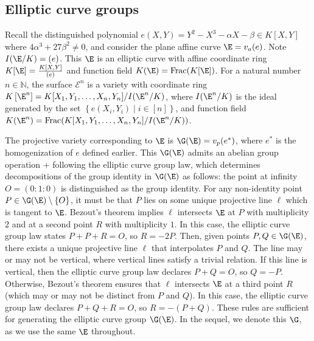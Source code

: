 \documentclass[11pt,letterpaper]{article}
\newcommand{\polys}{K[X,Y]}
\newcommand{\productpolys}{K[X_1, Y_1, \ldots, X_n, Y_n]}
\theoremstyle{definition}
\newcommand{\ff}{K(\E)}
\newcommand{\6}{\mathbf}
\newcommand{\7}{\mathcal}
\begin{document}

\subsection{Elliptic curve groups}

Recall the distinguished polynomial $e(X,Y) = Y^2 - X^3 - \alpha X - \beta \in \polys$ where $4\alpha^3 + 27\beta^2 \neq 0$, and consider the plane affine curve $\E = v_a(e)$. Note $I(\E/K) = (e)$. This $\E$ is an elliptic curve with affine coordinate ring $K[\E] = \frac{K[X,Y]}{(e)}$ and function field $K(\E) = \text{Frac}(K[\E])$. 
For a natural number $n \in \mathbb{N}$, the surface $\mathcal{E}^n$ is a variety with coordinate ring $K\left[\E^n\right] = \productpolys/I(\E^n/K)$, where $I(\E^n/K)$ is the ideal generated by the set $\left\{e(X_i, Y_i) \mid i \in [n]\right\}$, and function field $K(\E^n) = \text{Frac}(\productpolys/I(\E^n/K))$.

The projective variety corresponding to $\E$ is $\G(\E) = v_p(e^*)$, where $e^*$ is the homogenization of $e$ defined earlier. This $\G(\E)$ admits an abelian group operation $+$ following the elliptic curve group law, which determines decompositions of the group identity in $\G(\E)$ as follows: the point at infinity $O=(0:1:0)$ is distinguished as the group identity. For any non-identity point $P \in \G(\E) \setminus \{O\}$, it must be that $P$ lies on some unique projective line $\ell$ which is tangent to $\E$. Bezout's theorem implies $\ell$ intersects $\E$ at $P$ with multiplicity $2$ and at a second point $R$ with multiplicity $1$. In this case, the elliptic curve group law states $P + P + R = O$, so $R = -2P$. Then, given points $P, Q \in \G(\E)$, there exists a unique projective line $\ell$ that interpolates $P$ and $Q$. The line may or may not be vertical, where vertical lines satisfy a trivial relation. If this line is vertical, then the elliptic curve group law declares $P + Q = O$, so $Q = -P$. Otherwise, Bezout's theorem ensures that $\ell$ intersects $\E$ at a third point $R$ (which may or may not be distinct from $P$ and $Q$). In this case, the elliptic curve group law declares $P + Q + R = O$, so $R = -(P+Q)$. These rules are sufficient for generating the elliptic curve group $\G(\E)$. In the sequel, we denote this $\G$, as we use the same $\E$ throughout.
\end{document}
